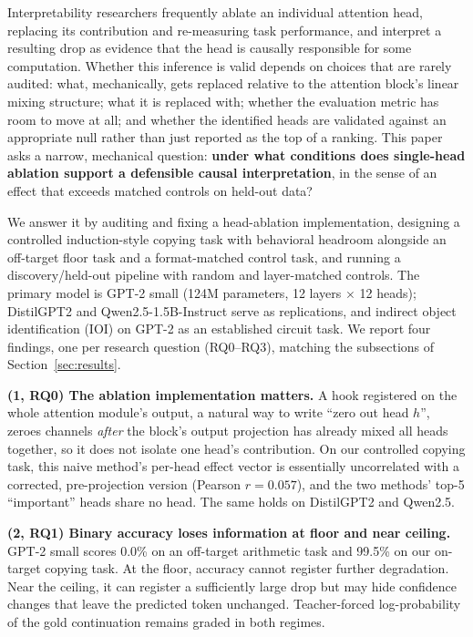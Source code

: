 \documentclass{article}
\begin{document}
Interpretability researchers frequently ablate an individual attention
head, replacing its contribution and re-measuring task performance, and
interpret a resulting drop as evidence that the head is causally
responsible for some computation. Whether this inference is valid
depends on choices that are rarely audited: what, mechanically, gets
replaced relative to the attention block's linear mixing structure;
what it is replaced with; whether the evaluation metric has room to move
at all; and whether the identified heads are validated against an
appropriate null rather than just reported as the top of a ranking. This
paper asks a narrow, mechanical question: \textbf{under what conditions
does single-head ablation support a defensible causal interpretation},
in the sense of an effect that exceeds matched controls on held-out
data?

We answer it by auditing and fixing a head-ablation implementation,
designing a controlled induction-style copying task with behavioral
headroom alongside an off-target floor task and a format-matched control
task, and running a discovery/held-out pipeline with random and
layer-matched controls. The primary model is GPT-2 small (124M
parameters, 12 layers $\times$ 12 heads); DistilGPT2 and
Qwen2.5-1.5B-Instruct serve as replications, and indirect object
identification (IOI) on GPT-2 as an established circuit task. We report
four findings, one per research question (RQ0--RQ3), matching the
subsections of Section~\ref{sec:results}.

\textbf{(1, RQ0) The ablation implementation matters.} A hook registered on
the whole attention module's output, a natural way to write ``zero out
head $h$'', zeroes channels \emph{after} the block's output projection
has already mixed all heads together, so it does not isolate one head's
contribution. On our controlled copying task, this naive method's per-head effect
vector is essentially uncorrelated with a corrected, pre-projection
version (Pearson $r=0.057$), and the two methods' top-5 ``important''
heads share no head. The same holds on DistilGPT2 and Qwen2.5.

\textbf{(2, RQ1) Binary accuracy loses information at floor and near ceiling.} GPT-2
small scores 0.0\% on an off-target arithmetic task and 99.5\% on our
on-target copying task. At the floor, accuracy cannot register further
degradation. Near the ceiling, it can register a sufficiently large
drop but may hide confidence changes that leave the predicted token
unchanged. Teacher-forced log-probability of the gold continuation
remains graded in both regimes.
\end{document}
